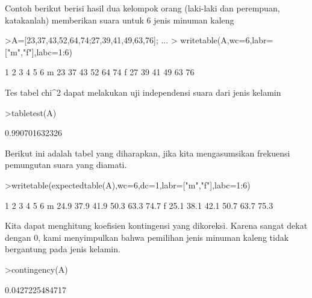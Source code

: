\documentclass[a4paper,10pt]{article}
\begin{document}
\begin{eulernotebook}
\begin{eulercomment}
\begin{eulercomment}
\begin{eulercomment}
\begin{eulercomment}
\begin{eulercomment}
\begin{eulercomment}
\begin{eulercomment}
\begin{eulercomment}
\begin{eulercomment}
\begin{eulercomment}
\begin{eulercomment}
\begin{eulercomment}
\begin{eulercomment}
\begin{eulercomment}
\begin{eulercomment}
\begin{eulercomment}
\begin{eulercomment}
\begin{eulercomment}
\begin{eulercomment}
Contoh berikut berisi hasil dua kelompok orang (laki-laki dan
perempuan, katakanlah) memberikan suara untuk 6 jenis minuman kaleng
\end{eulercomment}
\begin{eulerprompt}
>A=[23,37,43,52,64,74;27,39,41,49,63,76];  ...
>  writetable(A,wc=6,labr=["m","f"],labc=1:6)
\end{eulerprompt}
\begin{euleroutput}
             1     2     3     4     5     6
       m    23    37    43    52    64    74
       f    27    39    41    49    63    76
\end{euleroutput}
\begin{eulercomment}
Tes tabel chi\textasciicircum{}2 dapat melakukan uji independensi suara dari jenis
kelamin
\end{eulercomment}
\begin{eulerprompt}
>tabletest(A)
\end{eulerprompt}
\begin{euleroutput}
  0.990701632326
\end{euleroutput}
\begin{eulercomment}
Berikut ini adalah tabel yang diharapkan, jika kita mengasumsikan
frekuensi pemungutan suara yang diamati.
\end{eulercomment}
\begin{eulerprompt}
>writetable(expectedtable(A),wc=6,dc=1,labr=["m","f"],labc=1:6)
\end{eulerprompt}
\begin{euleroutput}
             1     2     3     4     5     6
       m  24.9  37.9  41.9  50.3  63.3  74.7
       f  25.1  38.1  42.1  50.7  63.7  75.3
\end{euleroutput}
\begin{eulercomment}
Kita dapat menghitung koefisien kontingensi yang dikoreksi. Karena
sangat dekat dengan 0, kami menyimpulkan bahwa pemilihan jenis minuman
kaleng tidak bergantung pada jenis kelamin.
\end{eulercomment}
\begin{eulerprompt}
>contingency(A)
\end{eulerprompt}
\begin{euleroutput}
  0.0427225484717
\end{euleroutput}
\begin{eulercomment}
\end{eulercomment}
\begin{eulercomment}

\end{eulercomment}
\end{eulercomment}
\end{eulercomment}
\end{eulercomment}
\end{eulercomment}
\end{eulercomment}
\end{eulercomment}
\end{eulercomment}
\end{eulercomment}
\end{eulercomment}
\end{eulercomment}
\end{eulercomment}
\end{eulercomment}
\end{eulercomment}
\end{eulercomment}
\end{eulercomment}
\end{eulercomment}
\end{eulercomment}
\end{eulercomment}
\end{eulernotebook}
\end{document}
